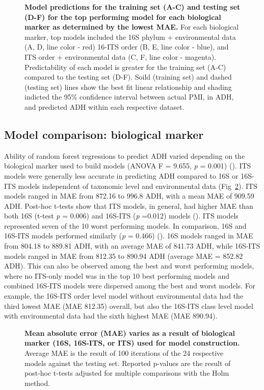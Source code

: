 \documentclass[
  10pt,
  letterpaper,
]{article}
\begin{document}
\begin{figure}[!h]
\caption{{\bf Model predictions for the training set (A-C) and testing set (D-F) for the top performing model for each biological marker as determined by the lowest MAE.}
For each biological marker, top models included the 16S phylum + environmental data (A, D, line color - red) 16-ITS order (B, E, line color - blue), and ITS order + environmental data (C, F, line color - magenta). Predictability of each model is greater for the training set (A-C) compared to the testing set (D-F). Soild (training set) and dashed (testing set) lines show the best fit linear relationship and shading indicted the 95\% confidence interval between actual PMI, in ADH, and predicted ADH within each respective dataset.}
\label{fig2}
\end{figure}

\subsection{Model comparison: biological
marker}\label{model-comparison-biological-marker}

Ability of random forest regressions to predict ADH varied depending on
the biological marker used to build models (ANOVA F = 9.655, \emph{p} =
0.001) (). ITS models were generally less accurate in
predicting ADH compared to 16S or 16S-ITS models independent of
taxonomic level and environmental data (Fig~\ref{fig3}). ITS models
ranged in MAE from 872.16 to 996.8 ADH, with a mean MAE of 909.59 ADH.
Post-hoc t-tests show that ITS models, in general, had higher MAE than
both 16S (t-test \emph{p} = 0.006) and 16S-ITS (\emph{p} =0.012) models
(). ITS models represented seven of the 10 worst
performing models. In comparison, 16S and 16S-ITS models performed
similarly (\emph{p} = 0.466) (). 16S models ranged in
MAE from 804.18 to 889.81 ADH, with an average MAE of 841.73 ADH, while
16S-ITS models ranged in MAE from 812.35 to 890.94 ADH (average MAE =
852.82 ADH). This can also be observed among the best and worst
performing models, where no ITS-only model was in the top 10 best
performing models and combined 16S-ITS models were dispersed among the
best and worst models. For example, the 16S-ITS order level model
without environmental data had the third lowest MAE (MAE 812.35)
overall, but also the 16S-ITS class level model with environmental data
had the sixth highest MAE (MAE 890.94).

\begin{figure}[!h]
\caption{{\bf Mean absolute error (MAE) varies as a result of biological marker (16S, 16S-ITS, or ITS) used for model construction.}
Average MAE is the result of 100 iterations of the 24 respective models against the testing set. Reported p-values are the result of post-hoc t-tests adjusted for multiple comparisons with the Holm method.}
\label{fig3}
\end{figure}
\end{document}
